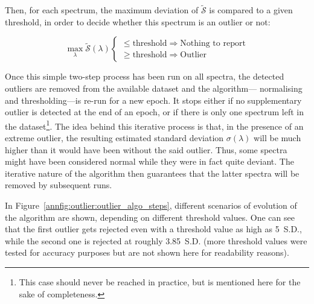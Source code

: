 Then, for each spectrum, the maximum deviation of $\widetilde{\mathcal{S}}$ is compared to a given threshold, in order to decide whether this spectrum is an outlier or not:

\begin{equation}
	\max_{\lambda} \widetilde{\mathcal{S}}(\lambda)
	\begin{cases}
		\leq \text{threshold} \Longrightarrow \text{Nothing to report} \\
		\geq \text{threshold} \Longrightarrow \text{Outlier}
	\end{cases}
\end{equation}

Once this simple two-step process has been run on all spectra, the detected outliers are removed from the available dataset and the algorithm---\ie{} normalising and thresholding---is re-run for a new epoch. It stops either if no supplementary outlier is detected at the end of an epoch, or if there is only one spectrum left in the dataset\footnote{This case should never be reached in practice, but is mentioned here for the sake of completeness.}. The idea behind this iterative process is that, in the presence of an extreme outlier, the resulting estimated standard deviation $\sigma(\lambda)$ will be much higher than it would have been without the said outlier. Thus, some spectra might have been considered normal while they were in fact quite deviant. The iterative nature of the algorithm then guarantees that the latter spectra will be removed by subsequent runs.

In Figure~\ref{annfig:outlier:outlier_algo_steps}, different scenarios of evolution of the algorithm are shown, depending on different threshold values. One can see that the first outlier gets rejected even with a threshold value as high as 5~S.D., while the second one is rejected at roughly 3.85~S.D. (more threshold values were tested for accuracy purposes but are not shown here for readability reasons).

